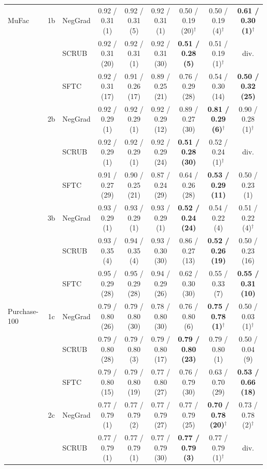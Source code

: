 \begin{table}[t]
{\begin{tabular}{l c l cccccc}
\midrule
MuFac & 1b & NegGrad & 0.92 / 0.31 (1) & 0.92 / 0.31 (5) & 0.92 / 0.31 (1) & 0.50 / 0.19 (20)$^{\dagger}$ & 0.50 / 0.19 (4)$^{\dagger}$ & \textbf{0.61 / 0.30 (1)$^{\dagger}$} \\
 &  & SCRUB & 0.92 / 0.31 (20) & 0.92 / 0.31 (1) & 0.92 / 0.31 (30) & \textbf{0.51 / 0.28 (5)} & 0.51 / 0.19 (1)$^{\dagger}$ & div. \\
 &  & SFTC & 0.92 / 0.31 (17) & 0.91 / 0.26 (17) & 0.89 / 0.25 (21) & 0.76 / 0.29 (28) & 0.54 / 0.30 (14) & \textbf{0.50 / 0.32 (25)} \\
 & 2b & NegGrad & 0.92 / 0.29 (1) & 0.92 / 0.29 (1) & 0.92 / 0.29 (12) & 0.89 / 0.27 (30) & \textbf{0.81 / 0.29 (6)$^{\dagger}$} & 0.90 / 0.28 (1)$^{\dagger}$ \\
 &  & SCRUB & 0.92 / 0.29 (1) & 0.92 / 0.29 (1) & 0.92 / 0.29 (24) & \textbf{0.51 / 0.28 (30)} & 0.52 / 0.24 (1)$^{\dagger}$ & div. \\
 &  & SFTC & 0.91 / 0.27 (29) & 0.90 / 0.25 (21) & 0.87 / 0.24 (29) & 0.64 / 0.26 (28) & \textbf{0.53 / 0.29 (11)} & 0.50 / 0.23 (1) \\
 & 3b & NegGrad & 0.93 / 0.29 (1) & 0.93 / 0.29 (1) & 0.93 / 0.29 (1) & \textbf{0.52 / 0.24 (24)} & 0.54 / 0.22 (4) & 0.51 / 0.22 (4)$^{\dagger}$ \\
 &  & SCRUB & 0.93 / 0.35 (4) & 0.94 / 0.35 (4) & 0.93 / 0.30 (30) & 0.86 / 0.27 (13) & \textbf{0.52 / 0.26 (19)} & 0.50 / 0.23 (16) \\
 &  & SFTC & 0.95 / 0.29 (28) & 0.95 / 0.29 (28) & 0.94 / 0.29 (26) & 0.62 / 0.30 (30) & 0.55 / 0.33 (7) & \textbf{0.55 / 0.31 (10)} \\
\midrule
Purchase-100 & 1c & NegGrad & 0.79 / 0.80 (26) & 0.79 / 0.80 (30) & 0.78 / 0.80 (30) & 0.76 / 0.80 (6) & \textbf{0.75 / 0.78 (1)$^{\dagger}$} & 0.50 / 0.03 (1)$^{\dagger}$ \\
 &  & SCRUB & 0.79 / 0.80 (28) & 0.79 / 0.80 (3) & 0.79 / 0.80 (17) & \textbf{0.79 / 0.80 (23)} & 0.79 / 0.80 (1) & 0.50 / 0.04 (9) \\
 &  & SFTC & 0.79 / 0.80 (15) & 0.79 / 0.80 (19) & 0.77 / 0.80 (27) & 0.76 / 0.79 (30) & 0.63 / 0.70 (29) & \textbf{0.53 / 0.66 (18)} \\
 & 2c & NegGrad & 0.77 / 0.79 (1) & 0.77 / 0.79 (2) & 0.77 / 0.79 (27) & 0.77 / 0.79 (25) & \textbf{0.70 / 0.78 (20)$^{\dagger}$} & 0.73 / 0.78 (2)$^{\dagger}$ \\
 &  & SCRUB & 0.77 / 0.79 (1) & 0.77 / 0.79 (1) & 0.77 / 0.79 (30) & \textbf{0.77 / 0.79 (3)} & 0.77 / 0.79 (1)$^{\dagger}$ & div. \\

\end{tabular}}
\end{table}
